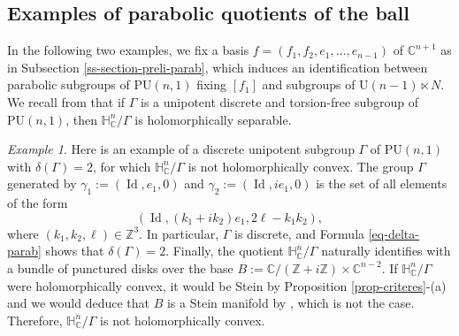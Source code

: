 \documentclass{article}
\theoremstyle{definition}
\theoremstyle{remark}
\newtheorem*{example}{Example}
\newcommand{\C}{\mathbb{C}}
\newcommand{\Z}{\mathbb{Z}}
\newcommand{\HNC}{\mathbb{H}^{n}_{\C}}
\newcommand{\PU}{\mathrm{PU}}
\DeclareMathOperator{\Id}{\text{Id}}
\begin{document}
	\subsection{Examples of parabolic quotients of the ball}
	In the following two examples, we fix a basis $f=(f_1,f_2,e_1,\dots,e_{n-1})$ of $\C^{n+1}$ as in Subsection \ref{ss-section-preli-parab}, which induces an identification between parabolic subgroups of $\PU(n,1)$ fixing $[f_1]$ and subgroups of $\mathrm{U}(n-1)\ltimes N$. We recall from \cite[Proposition 1.1]{miebachQuotientsBoundedHomogeneous2024} that if $\Gamma$ is a unipotent discrete and torsion-free subgroup of $\PU(n,1)$, then $\HNC/\Gamma$ is holomorphically separable.
	
	\begin{example}Here is an example of a discrete unipotent subgroup $\Gamma$ of $\PU(n,1)$ with $\delta(\Gamma)=2$, for which $\HNC/\Gamma$ is not holomorphically convex. The group $\Gamma$ generated by $\gamma_1 :=(\Id,e_1,0)$ and $\gamma_2:=(\Id, ie_1,0)$ is the set of all elements of the form \begin{equation*}
			(\Id,(k_1+ik_2)e_1,2\ell-k_1k_2),
		\end{equation*}
		where $(k_1,k_2,\ell)\in \Z^3$. In particular, $\Gamma$ is discrete, and Formula \eqref{eq-delta-parab} shows that $\delta(\Gamma)=2$. Finally, the quotient $\HNC/\Gamma$ naturally identifies with a bundle of punctured disks over the base $B:=\C/(\Z+i\Z) \times \C^{n-2}$. If $\HNC/\Gamma$ were holomorphically convex, it would be Stein by Proposition \ref{prop-criteres}-(a) and we would deduce that $B$ is a Stein manifold by \cite[Lemma 1.6]{coltoiuOpenSetsStein1997}, which is not the case. Therefore, $\HNC/\Gamma$ is not holomorphically convex.
	\end{example}
	
\end{document}

